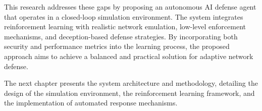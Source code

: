 \documentclass[12pt,a4paper]{report}
\begin{document}
This research addresses these gaps by proposing an autonomous AI defense agent that operates in a closed-loop simulation environment.
The system integrates reinforcement learning with realistic network emulation, low-level enforcement mechanisms, and deception-based defense strategies.
By incorporating both security and performance metrics into the learning process, the proposed approach aims to achieve a balanced and practical solution for adaptive network defense.

The next chapter presents the system architecture and methodology, detailing the design of the simulation environment, the reinforcement learning framework, and the implementation of automated response mechanisms.



\end{document}
